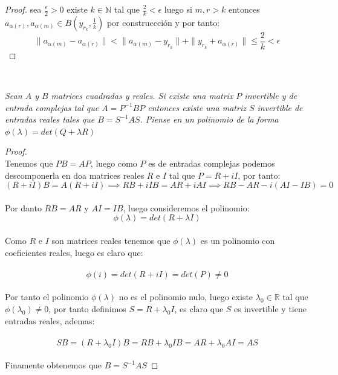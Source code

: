 \documentclass[11pt,letterpaper]{article}
\newcommand{\R}{\mathbb{R}}
\newcommand{\N}{\mathbb{N}}
\begin{document}
\begin{proof}
    sea $\frac{\epsilon}{2}>0$ existe $k\in \N$ tal que $\frac{2}{k}<\epsilon$ luego si $m,r>k$ entonces $a_{\alpha(r)},a_{\alpha (m)}\in B\left(y_{r_k},\frac{1}{k}\right)$ por construccci\'on y por tanto:\,\\
    \begin{equation*}
        \|a_{\alpha(m)}-a_{\alpha(r)}\|<\|a_{\alpha(m)}-y_{r_k}\|+\|y_{r_k}+a_{\alpha(r)}\|\leq\frac{2}{k}<\epsilon
    \end{equation*}
\end{proof}\,\\
\begin{tcolorbox}[
	title = \textcolor{black}{\textcolor{white}{Problema 4}},]
\textit{Sean $A$ y $B$ matrices cuadradas y reales. Si existe una matrix $P$ invertible y de entrada complejas tal que $A=P^{-1}BP$ entonces existe una matriz $S$ invertible de entradas reales tales que $B=S^{-1}AS$. Piense en un polinomio de la forma $\phi(\lambda)=det(Q+\lambda R)$}
\end{tcolorbox}
\begin{proof}\,\\
    Tenemos que $PB=AP$, luego como $P$ es de entradas complejas podemos descomponerla en doa matrices reales $R$ e $I$ tal que $P=R+iI$, por tanto:\,\\
    \begin{equation*}
        (R+iI)B=A(R+iI)\implies RB+iIB=AR+iAI \implies RB-AR-i(AI-IB)=0
    \end{equation*}\,\\
    Por danto $RB=AR$ y $AI=IB$, luego consideremos el polinomio:\,\\
    \begin{equation*}
        \phi(\lambda)=det(R+\lambda I)
    \end{equation*}\,\\
    Como $R$ e $I$ son matrices reales tenemos que $\phi(\lambda)$ es un polinomio con coeficientes reales, luego es claro que:\,\\
    \,\\
    \begin{equation*}
        \phi(i)=det(R+iI)=det(P)\neq 0
    \end{equation*}\,\\
    Por tanto el polinomio $\phi(\lambda)$ no es el polinomio nulo, luego existe $\lambda_0\in \R$ tal que $\phi(\lambda_0)\neq 0$, por tanto 
    definimos $S=R+\lambda_0 I$, es claro que $S$ es invertible y tiene entradas reales, ademas:\,\\
    \,\\
    \begin{equation*}
        SB=(R+\lambda_0 I)B=RB+\lambda_0 IB=AR+\lambda_0 AI=AS
    \end{equation*}\,\\
    Finamente obtenemos que $B=S^{-1}AS$
\end{proof}
\end{document}
